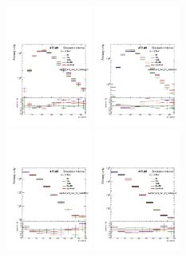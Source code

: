 \begin{figure}[htbp!]
\begin{center}
\includegraphics[angle=270, width=0.25\textwidth]{./figures/boosted/AppendixDijetMC/leadHCand_trk0_Pt_Sidebandlessbin_log.pdf}
\includegraphics[angle=270, width=0.25\textwidth]{./figures/boosted/AppendixDijetMC/leadHCand_trk0_Pt_Sidebanddata_log.pdf}\\
\includegraphics[angle=270, width=0.25\textwidth]{./figures/boosted/AppendixDijetMC/leadHCand_trk1_Pt_Sidebandlessbin_log.pdf}
\includegraphics[angle=270, width=0.25\textwidth]{./figures/boosted/AppendixDijetMC/leadHCand_trk1_Pt_Sidebanddata_log.pdf}\\

\end{center}
\end{figure}
